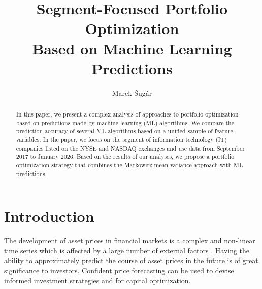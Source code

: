 \documentclass{svk_en}
\begin{document}
\title{Segment-Focused Portfolio Optimization \\ Based on Machine Learning Predictions}

\author{Marek Šugár
}






\maketitle

\begin{abstract}
In this paper, we present a complex analysis of approaches to portfolio optimization based on predictions made by machine learning (ML)
algorithms. We compare the prediction accuracy of several ML algorithms based on a unified sample of feature variables. In the paper, we focus on the
segment of information technology (IT) companies listed on the NYSE and NASDAQ exchanges and use data from September 2017 to January 2026. Based on the results of our analyses, we propose a portfolio optimization strategy
that combines the Markowitz mean-variance approach with ML predictions. 

\end{abstract}

\section{Introduction}

The development of asset prices in financial markets is a complex 
and non-linear time series which is affected by a large number of 
external factors \cite{konferencia1}. Having the ability to 
approximately predict the course of asset prices in the future 
is of great significance to investors. Confident price forecasting
can be used to devise informed investment strategies and for capital optimization.  
\end{document}
